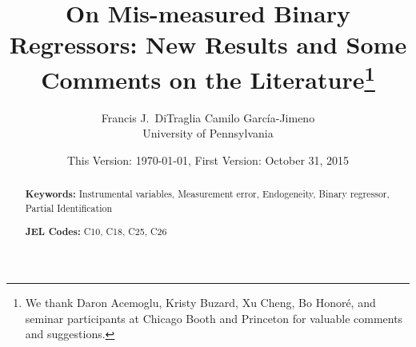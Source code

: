 \documentclass[12pt]{article}
\title{On Mis-measured Binary Regressors: New Results and Some Comments on the Literature\footnote{We thank Daron Acemoglu, Kristy Buzard, Xu Cheng, Bo Honor\'{e}, and seminar participants at Chicago Booth and Princeton for valuable comments and suggestions.}}
\author{Francis J.\ DiTraglia  \hspace{2em} Camilo Garc\'{i}a-Jimeno\\
\normalsize University of Pennsylvania}
\date{\small This Version: \today, First Version: October 31, 2015}
\begin{document}
\maketitle


\begin{abstract}
  \singlespacing
	

  	\bigskip
	\noindent\textbf{Keywords:} Instrumental variables, Measurement error, Endogeneity, Binary regressor, Partial Identification

	\medskip
  \noindent\textbf{JEL Codes:} C10, C18, C25, C26
\end{abstract}

\newpage









\begin{appendices}

\end{appendices}



\end{document}

